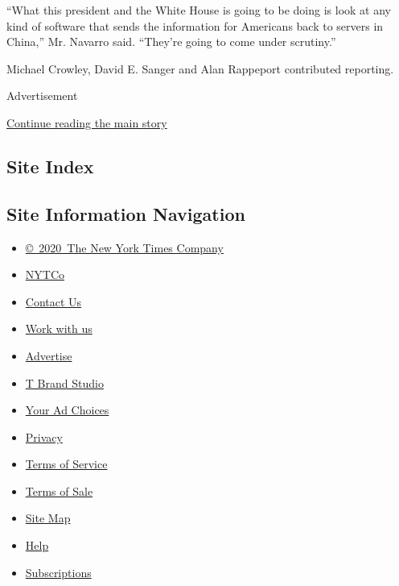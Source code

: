 ``What this president and the White House is going to be doing is look
at any kind of software that sends the information for Americans back to
servers in China,'' Mr. Navarro said. ``They're going to come under
scrutiny.''

Michael Crowley, David E. Sanger and Alan Rappeport contributed
reporting.

Advertisement

\protect\hyperlink{after-bottom}{Continue reading the main story}

\hypertarget{site-index}{%
\subsection{Site Index}\label{site-index}}

\hypertarget{site-information-navigation}{%
\subsection{Site Information
Navigation}\label{site-information-navigation}}

\begin{itemize}
\tightlist
\item
  \href{https://help.nytimes.com/hc/en-us/articles/115014792127-Copyright-notice}{©~2020~The
  New York Times Company}
\end{itemize}

\begin{itemize}
\tightlist
\item
  \href{https://www.nytco.com/}{NYTCo}
\item
  \href{https://help.nytimes.com/hc/en-us/articles/115015385887-Contact-Us}{Contact
  Us}
\item
  \href{https://www.nytco.com/careers/}{Work with us}
\item
  \href{https://nytmediakit.com/}{Advertise}
\item
  \href{http://www.tbrandstudio.com/}{T Brand Studio}
\item
  \href{https://www.nytimes.com/privacy/cookie-policy\#how-do-i-manage-trackers}{Your
  Ad Choices}
\item
  \href{https://www.nytimes.com/privacy}{Privacy}
\item
  \href{https://help.nytimes.com/hc/en-us/articles/115014893428-Terms-of-service}{Terms
  of Service}
\item
  \href{https://help.nytimes.com/hc/en-us/articles/115014893968-Terms-of-sale}{Terms
  of Sale}
\item
  \href{https://spiderbites.nytimes.com}{Site Map}
\item
  \href{https://help.nytimes.com/hc/en-us}{Help}
\item
  \href{https://www.nytimes.com/subscription?campaignId=37WXW}{Subscriptions}
\end{itemize}
